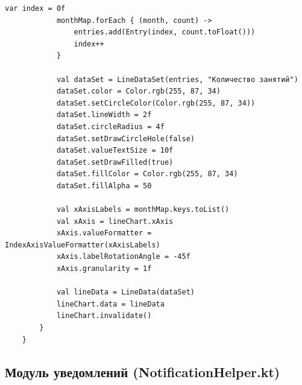 \begin{lstlisting}[breaklines=true]
			var index = 0f
			monthMap.forEach { (month, count) ->
				entries.add(Entry(index, count.toFloat()))
				index++
			}
			
			val dataSet = LineDataSet(entries, "Количество занятий")
			dataSet.color = Color.rgb(255, 87, 34)
			dataSet.setCircleColor(Color.rgb(255, 87, 34))
			dataSet.lineWidth = 2f
			dataSet.circleRadius = 4f
			dataSet.setDrawCircleHole(false)
			dataSet.valueTextSize = 10f
			dataSet.setDrawFilled(true)
			dataSet.fillColor = Color.rgb(255, 87, 34)
			dataSet.fillAlpha = 50
			
			val xAxisLabels = monthMap.keys.toList()
			val xAxis = lineChart.xAxis
			xAxis.valueFormatter = IndexAxisValueFormatter(xAxisLabels)
			xAxis.labelRotationAngle = -45f
			xAxis.granularity = 1f
			
			val lineData = LineData(dataSet)
			lineChart.data = lineData
			lineChart.invalidate()
		}
	}
\end{lstlisting}

\subsection{Модуль уведомлений (NotificationHelper.kt)}

